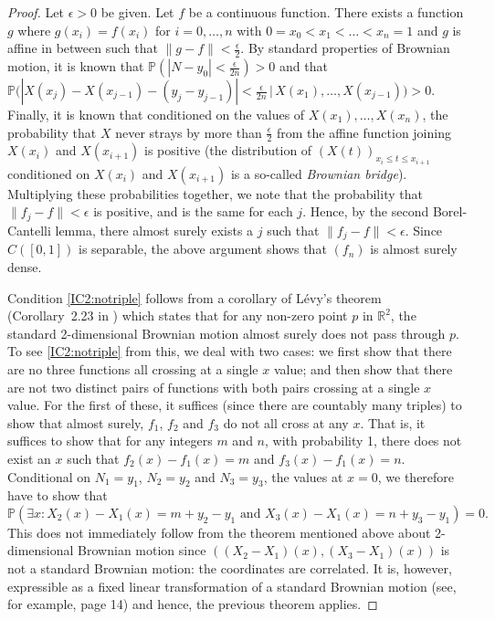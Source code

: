 \documentclass{daj}
\newcommand{\R}{\mathbb R}
\newcommand{\PP}{\mathbb P}
\begin{document}
\begin{proof}
Let $\epsilon>0$ be given. Let $f$ be a continuous function. There exists a
function $g$ where $g(x_i)=f(x_i)$ for $i=0,\ldots,n$ with $0=x_0<x_1<\ldots<x_n=1$
and $g$ is affine in between such that
$\|g-f\|<\frac\epsilon2$. By standard properties of Brownian motion, it is
known that $\PP(|N-y_0|<\frac\epsilon {2n})>0$ and that $\PP\big(|X(x_j)-X(x_{j-1})-(y_j-y_{j-1})|<
\frac\epsilon{2n}\,\big|\,X(x_1),
\ldots,X(x_{j-1})\big)>0$. Finally, it is known that conditioned on the values of
$X(x_1),\ldots,X(x_n)$, the probability that $X$ never strays by more than
$\frac\epsilon2$ from the affine function
joining $X(x_i)$ and $X(x_{i+1})$ is positive (the distribution of
$(X(t))_{x_i\le t\le x_{i+1}}$ conditioned on $X(x_i)$ and $X(x_{i+1})$
is a so-called \emph{Brownian bridge}). Multiplying these
probabilities together, we note that the probability that $\|f_j-f\|<\epsilon$ is
positive, and is the same for each $j$. Hence, by the second Borel-Cantelli lemma,
there almost surely exists a $j$
such that $\|f_j-f\|<\epsilon$. Since $C([0,1])$ is separable, the above argument
shows that $(f_n)$ is almost surely dense.

Condition \ref{IC2:notriple} follows from a corollary of L\'evy's theorem
(Corollary~2.23 in \cite{MortersPeres}) which states that
for any non-zero point $p$ in $\R^2$, the standard 2-dimensional Brownian motion
almost surely does not pass through $p$. To see \ref{IC2:notriple} from this,
we deal with two cases: we first show that there
are no three functions all crossing at a single $x$ value; and then show that
there are not two distinct pairs of functions with both pairs crossing at a single $x$
value. For the first of these, it suffices (since there are countably many triples)
to show that almost surely, $f_1$, $f_2$ and $f_3$ do not
all cross at any $x$. That is, it suffices to show that for any
integers $m$ and $n$, with probability 1, there does not exist an $x$
such that $f_2(x)-f_1(x)=m$ and $f_3(x)-f_1(x)=n$. Conditional on
$N_1=y_1$, $N_2=y_2$ and $N_3=y_3$, the values at $x=0$,
we therefore have to show that
$$
\PP(\exists x\colon X_2(x)-X_1(x)=m+y_2-y_1\text{ and }
X_3(x)-X_1(x)=n+y_3-y_1)=0.
$$
This does not immediately follow from the theorem mentioned above
about 2-dimensional Brownian motion since $((X_2-X_1)(x),(X_3-X_1)(x))$
is not a standard Brownian motion: the coordinates are correlated. It is,
however, expressible as a fixed
linear transformation of a standard Brownian motion (see, for example,
\cite{MortersPeres} page 14) and hence, the previous theorem applies.


\end{proof}
\end{document}

